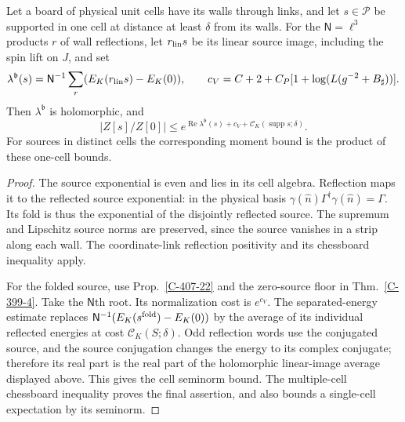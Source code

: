 \documentclass[11pt,letterpaper,reqno]{amsart}
\makeatletter
\theoremstyle{definition}
\newcommand{\ms@minorstart}{%
  \pushQED{\qed}\renewcommand{\qedsymbol}{$\blacksquare$}}
\newenvironment{proposition}[1][]{\ms@minorstart\ms@proposition[#1]}
  {\popQED\endms@proposition}
\theoremstyle{remark}
\makeatother
\begin{document}
\begin{proposition}[A source in one cell]\label{C-407-30}
Let a board of physical unit cells have its walls through
links, and let $s\in\mathcal P$ be supported in one cell
at distance at least $\delta$ from its walls. For the
$\mathsf N=\ell^3$ products $r$ of wall reflections, let
$r_{\rm lin}s$ be its linear source image, including the
spin lift on $J$, and set
\[
 \lambda^{\mathfrak b}(s)=\mathsf N^{-1}
        \sum_r(E_K(r_{\rm lin}s)-E_K(0)),\qquad
 c_V=C+2+C_P[1+\log(L(g^{-2}+B_\sharp))].
\]
Then $\lambda^{\mathfrak b}$ is holomorphic, and
\begin{equation}\label{eq:qcd-cell-source-bound}
 |Z[s]/Z[0]|\le
 e^{\operatorname{Re}\lambda^{\mathfrak b}(s)+c_V+
                 \mathscr C_K(\operatorname{supp}s;\delta)}.
\end{equation}
For sources in distinct cells the corresponding moment
bound is the product of these one-cell bounds.
\end{proposition}
\begin{proof}
The source exponential is even and lies in its cell
algebra. Reflection maps it to the reflected source
exponential: in the physical basis
$\gamma(\hat n)\Gamma^\dagger\gamma(\hat n)=\Gamma$.
Its fold is thus the exponential of the disjointly
reflected source. The supremum and Lipschitz source
norms are preserved, since the source vanishes in a
strip along each wall. The coordinate-link reflection
positivity and its chessboard inequality apply.

For the folded source, use Prop.~\ref{C-407-22}
and the zero-source floor in Thm.~\ref{C-399-4}.
Take the $\mathsf N$th root. Its normalization cost is
$e^{c_V}$. The separated-energy estimate replaces
$\mathsf N^{-1}(E_K(s^{\rm fold})-E_K(0))$ by the
average of its individual reflected energies at cost
$\mathscr C_K(S;\delta)$. Odd reflection words use the
conjugated source, and the source conjugation changes
the energy to its complex conjugate; therefore its real
part is the real part of the holomorphic linear-image
average displayed above. This gives the cell seminorm
bound. The multiple-cell chessboard inequality proves
the final assertion, and also bounds a single-cell
expectation by its seminorm.
\end{proof}
\end{document}
